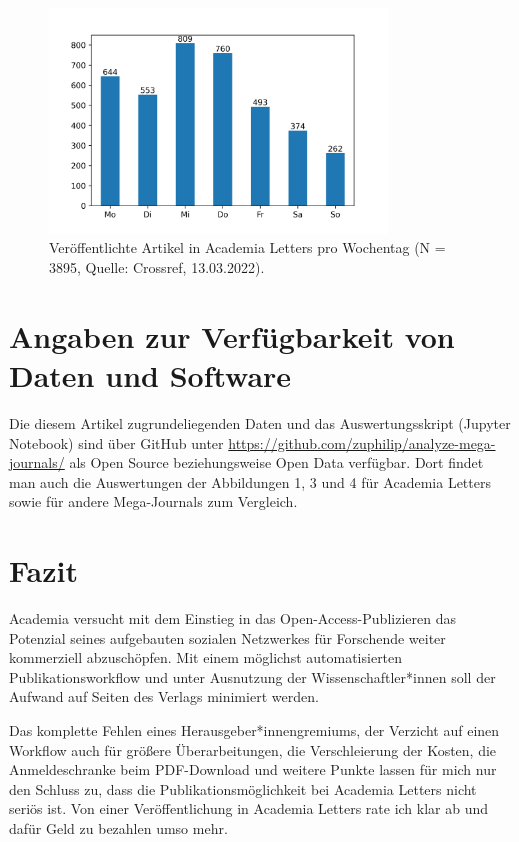 \documentclass[a4paper,
fontsize=11pt,
oneside,
numbers=noperiodatend,
parskip=half-,
bibliography=totoc,
final
]{scrartcl}
\begin{document}
\begin{figure}
\centering
\includegraphics[width=0.8\textwidth]{img/abb4.png}
\caption{Veröffentlichte Artikel in Academia Letters pro Wochentag (N =
3895, Quelle: Crossref, 13.03.2022).}
\end{figure}

\hypertarget{angaben-zur-verfuxfcgbarkeit-von-daten-und-software}{%
\section{Angaben zur Verfügbarkeit von Daten und
Software}\label{angaben-zur-verfuxfcgbarkeit-von-daten-und-software}}

Die diesem Artikel zugrundeliegenden Daten und das Auswertungsskript
(Jupyter Notebook) sind über GitHub unter
\url{https://github.com/zuphilip/analyze-mega-journals/} als Open Source
beziehungsweise Open Data verfügbar. Dort findet man auch die
Auswertungen der Abbildungen 1, 3 und 4 für Academia Letters sowie für
andere Mega-Journals zum Vergleich.

\hypertarget{fazit}{%
\section{Fazit}\label{fazit}}

Academia versucht mit dem Einstieg in das Open-Access-Publizieren das
Potenzial seines aufgebauten sozialen Netzwerkes für Forschende weiter
kommerziell abzuschöpfen. Mit einem möglichst automatisierten
Publikationsworkflow und unter Ausnutzung der Wissenschaftler*innen soll
der Aufwand auf Seiten des Verlags minimiert werden.

Das komplette Fehlen eines Herausgeber*innengremiums, der Verzicht auf
einen Workflow auch für größere Überarbeitungen, die Verschleierung der
Kosten, die Anmeldeschranke beim PDF-Download und weitere Punkte lassen
für mich nur den Schluss zu, dass die Publikationsmöglichkeit bei
Academia Letters nicht seriös ist. Von einer Veröffentlichung in
Academia Letters rate ich klar ab und dafür Geld zu bezahlen umso mehr.
\end{document}
